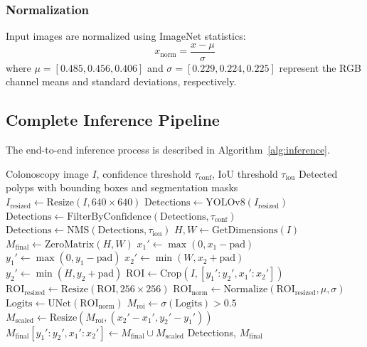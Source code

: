 \documentclass[conference]{IEEEtran}
\begin{document}
\subsubsection{Normalization}
Input images are normalized using ImageNet statistics:
\begin{equation}
    x_{\text{norm}} = \frac{x - \mu}{\sigma}
\end{equation}
where $\mu = [0.485, 0.456, 0.406]$ and $\sigma = [0.229, 0.224, 0.225]$ represent the RGB channel means and standard deviations, respectively.

\subsection{Complete Inference Pipeline}

The end-to-end inference process is described in Algorithm~\ref{alg:inference}.

\begin{algorithm}[htbp]
\caption{DetSEG Inference Pipeline}
\label{alg:inference}
\begin{algorithmic}[1]
\REQUIRE Colonoscopy image $I$, confidence threshold $\tau_{\text{conf}}$, IoU threshold $\tau_{\text{iou}}$
\ENSURE Detected polyps with bounding boxes and segmentation masks
\STATE $I_{\text{resized}} \leftarrow \text{Resize}(I, 640 \times 640)$
\STATE $\text{Detections} \leftarrow \text{YOLOv8}(I_{\text{resized}})$
\STATE $\text{Detections} \leftarrow \text{FilterByConfidence}(\text{Detections}, \tau_{\text{conf}})$
\STATE $\text{Detections} \leftarrow \text{NMS}(\text{Detections}, \tau_{\text{iou}})$
\STATE $H, W \leftarrow \text{GetDimensions}(I)$
\STATE $M_{\text{final}} \leftarrow \text{ZeroMatrix}(H, W)$
    \STATE $x_1' \leftarrow \max(0, x_1 - \text{pad})$
    \STATE $y_1' \leftarrow \max(0, y_1 - \text{pad})$
    \STATE $x_2' \leftarrow \min(W, x_2 + \text{pad})$
    \STATE $y_2' \leftarrow \min(H, y_2 + \text{pad})$
    \STATE $\text{ROI} \leftarrow \text{Crop}(I, [y_1':y_2', x_1':x_2'])$
    \STATE $\text{ROI}_{\text{resized}} \leftarrow \text{Resize}(\text{ROI}, 256 \times 256)$
    \STATE $\text{ROI}_{\text{norm}} \leftarrow \text{Normalize}(\text{ROI}_{\text{resized}}, \mu, \sigma)$
    \STATE $\text{Logits} \leftarrow \text{UNet}(\text{ROI}_{\text{norm}})$
    \STATE $M_{\text{roi}} \leftarrow \sigma(\text{Logits}) > 0.5$
    \STATE $M_{\text{scaled}} \leftarrow \text{Resize}(M_{\text{roi}}, (x_2'-x_1', y_2'-y_1'))$
    \STATE $M_{\text{final}}[y_1':y_2', x_1':x_2'] \leftarrow M_{\text{final}} \cup M_{\text{scaled}}$
\ENDFOR
\RETURN Detections, $M_{\text{final}}$
\end{algorithmic}
\end{algorithm}
\end{document}
